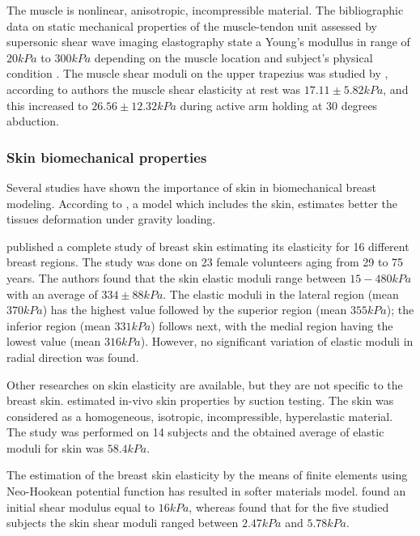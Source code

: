 The muscle is nonlinear, anisotropic, incompressible material.  The bibliographic data on static mechanical properties of the muscle-tendon unit assessed by supersonic shear wave imaging elastography state a Young's modullus in range of $20kPa$ to $300kPa$ depending on the muscle location and subject's physical condition \citep{lima_eassessment_2018}.  The muscle shear moduli on the upper trapezius was studied by \cite{leong_quantitative_2013}, according to authors the muscle shear elasticity at rest was $17.11\pm 5.82 kPa$, and this increased to $26.56\pm 12.32 kPa$ during active arm holding at 30 degrees abduction. 

\subsubsection*{Skin biomechanical properties}
Several studies have shown the importance of skin in biomechanical breast modeling. According to \cite{carter_biomechanical_2009}, a model which includes the skin, estimates better the tissues deformation under gravity loading.

 \cite{sutradhar_vivo_2013} published a complete study of breast skin estimating its elasticity for 16 different breast regions. The study was done on 23 female volunteers aging from 29 to 75 years. The authors found that the skin elastic moduli range between $15-480 kPa$ with an average of $334\pm 88 kPa$. The elastic moduli in the lateral region (mean $370 kPa$) has the highest value followed by the superior region (mean $355 kPa$); the inferior region (mean $331 kPa$) follows next, with the medial region having the
lowest value (mean $316 kPa$). However, no significant variation of elastic moduli in radial direction was found. 
 
Other researches on skin elasticity are available, but they are not specific to the breast skin. \cite{hendriks_relative_2006} estimated in-vivo skin properties by suction testing. The skin was considered as a homogeneous, isotropic, incompressible, hyperelastic material. The study was performed on 14 subjects and the obtained average of elastic moduli for skin was $58.4 kPa$.

The estimation of the breast skin elasticity by the means of finite elements using Neo-Hookean potential function has resulted in softer materials model. \cite{carter_determining_2009} found an initial shear modulus equal to $16kPa$, whereas \cite{han_nonlinear_2014} found that for the five studied subjects the skin shear moduli ranged between $2.47 kPa$ and $5.78kPa$. 


